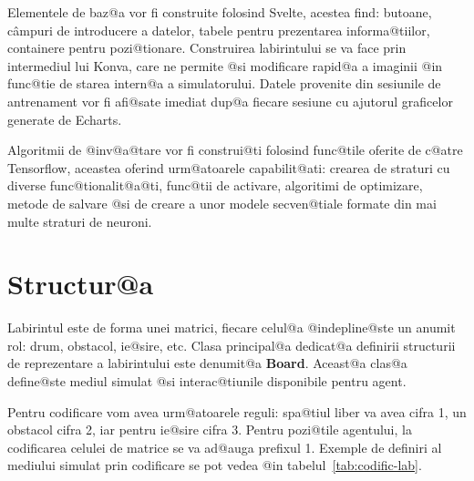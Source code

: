 Elementele de baz@a vor fi construite folosind Svelte, acestea find: butoane, c\^ ampuri de introducere a datelor, tabele pentru prezentarea informa@tiilor, containere pentru pozi@tionare. Construirea labirintului se va face prin intermediul lui Konva, care ne permite @si modificare rapid@a a imaginii @in func@tie de starea intern@a a simulatorului. Datele provenite din sesiunile de antrenament vor fi afi@sate imediat dup@a fiecare sesiune cu ajutorul graficelor generate de Echarts.

Algoritmii de @inv@a@tare vor fi construi@ti folosind func@tile oferite de c@atre Tensorflow, aceastea oferind urm@atoarele capabilit@ati: crearea de straturi cu diverse func@tionalit@a@ti, func@tii de activare, algoritimi de optimizare, metode de salvare @si de creare a unor modele secven@tiale formate din mai multe straturi de neuroni.

\section{Structur@a}


Labirintul este de forma unei matrici, fiecare celul@a @indepline@ste un anumit rol: drum, obstacol, ie@sire, etc. Clasa principal@a dedicat@a definirii structurii de reprezentare a la\-bi\-rin\-tului este denumit@a \textbf{Board}. Aceast@a clas@a define@ste mediul simulat @si interac@tiunile disponibile pentru agent.

Pentru codificare vom avea urm@atoarele reguli: spa@tiul liber va avea cifra 1, un obstacol cifra 2, iar pentru ie@sire cifra 3. Pentru pozi@tile agentului, la codificarea celulei de matrice se va ad@auga prefixul 1. Exemple de definiri al mediului simulat prin codificare se pot vedea @in tabelul~\ref{tab:codific-lab}.


